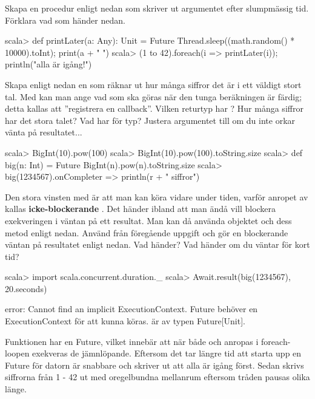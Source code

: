 \Subtask Skapa en procedur  enligt nedan som skriver ut argumentet efter slumpmässig tid. Förklara vad som händer nedan.
\begin{REPL}
scala> def printLater(a: Any): Unit =
         Future { Thread.sleep((math.random() * 10000).toInt); print(a + " ") }
scala> (1 to 42).foreach(i => printLater(i)); println("alla är igång!")
\end{REPL}

\Subtask Skapa enligt nedan en  som räknar ut hur många siffror det är i ett väldigt stort tal. Med  kan man ange vad som ska göras när den tunga beräkningen är färdig; detta kallas att ''registrera en callback''. Vilken returtyp har ? Hur många siffror har det stora talet? Vad har  för typ? Justera argumentet till  om du inte orkar vänta på resultatet...

\begin{REPL}
scala> BigInt(10).pow(100)
scala> BigInt(10).pow(100).toString.size
scala> def big(n: Int) = Future { BigInt(n).pow(n).toString.size }
scala> big(1234567).onComplete{r => println(r + " siffror") }
\end{REPL}

\Subtask Den stora vinsten med  är att man kan köra vidare under tiden, varför anropet av  kallas \textbf{icke-blockerande} . Det händer ibland att man ändå vill blockera exekveringen i väntan på ett resultat. Man kan då använda objektet  och dess metod  enligt nedan. Använd  från föregående uppgift och gör en blockerande väntan på resultatet enligt nedan. Vad händer? Vad händer om du väntar för kort tid?

\begin{REPL}
scala> import scala.concurrent.duration._
scala> Await.result(big(1234567), 20.seconds)
\end{REPL}



\SOLUTION


\TaskSolved \what

\SubtaskSolved  error: Cannot find an implicit ExecutionContext. Future behöver en ExecutionContext för att kunna köras.  är av typen Future[Unit].

\SubtaskSolved  Funktionen  har en Future, vilket innebär att när både  och  anropas i foreach-loopen exekveras de jämnlöpande. Eftersom det tar längre tid att starta upp en Future för datorn är  snabbare och skriver ut att alla är igång först. Sedan skrivs siffrorna från 1 - 42 ut med oregelbundna mellanrum eftersom tråden pausas olika länge.

